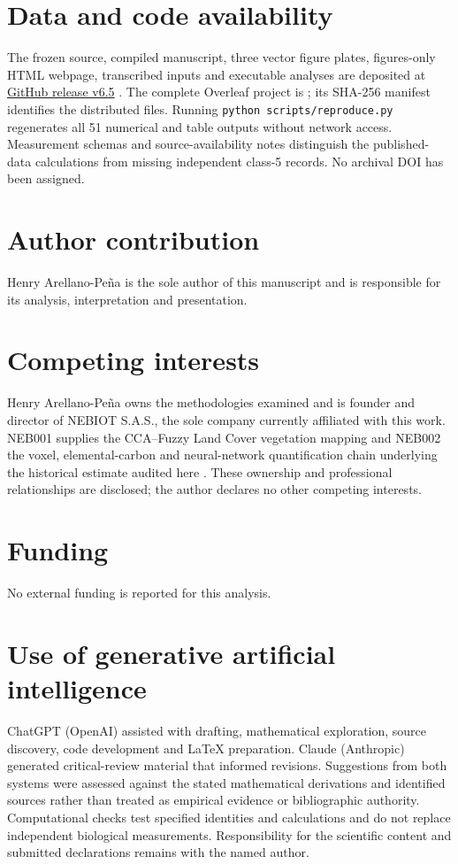 \documentclass[11pt,a4paper]{article}
\theoremstyle{remark}
\begin{document}
\section*{Data and code availability}
The frozen source, compiled manuscript, three vector figure plates, figures-only HTML webpage, transcribed inputs and executable analyses are deposited at \href{https://github.com/hyrucanji77/Tropical_Forest_Carbon-/releases/tag/v6.5}{GitHub release v6.5} \citep{Repository2026}. The complete Overleaf project is ; its SHA-256 manifest identifies the distributed files. Running \texttt{python scripts/reproduce.py} regenerates all 51 numerical and table outputs without network access. Measurement schemas and source-availability notes distinguish the published-data calculations from missing independent class-5 records. No archival DOI has been assigned.

\section*{Author contribution}
Henry Arellano-Pe\~na is the sole author of this manuscript and is responsible for its analysis, interpretation and presentation.

\section*{Competing interests}
Henry Arellano-Pe\~na owns the methodologies examined and is founder and director of NEBIOT S.A.S., the sole company currently affiliated with this work. NEB001 supplies the CCA--Fuzzy Land Cover vegetation mapping and NEB002 the voxel, elemental-carbon and neural-network quantification chain underlying the historical estimate audited here \citep{Arellano2016,NEBIOTMethods}. These ownership and professional relationships are disclosed; the author declares no other competing interests.

\section*{Funding}
No external funding is reported for this analysis.

\section*{Use of generative artificial intelligence}
ChatGPT (OpenAI) assisted with drafting, mathematical exploration, source discovery, code development and LaTeX preparation. Claude (Anthropic) generated critical-review material that informed revisions. Suggestions from both systems were assessed against the stated mathematical derivations and identified sources rather than treated as empirical evidence or bibliographic authority. Computational checks test specified identities and calculations and do not replace independent biological measurements. Responsibility for the scientific content and submitted declarations remains with the named author.
\end{document}

